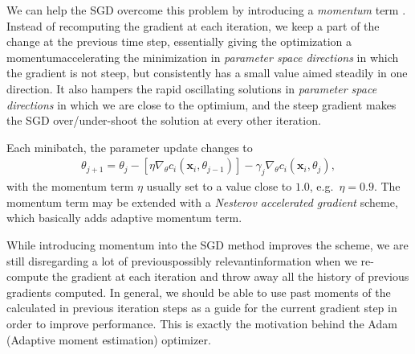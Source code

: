 \documentclass[a4paper, twocolumn]{article}
\begin{document}
We can help the SGD overcome this problem by introducing a \textit{momentum} term \autocite{qian1999monentum}. Instead of recomputing the gradient at each iteration, we keep a part of the change at the previous time step, essentially giving the optimization a momentum\textemdash accelerating the minimization in \textit{parameter space directions} in which the gradient is not steep, but consistently has a small value aimed steadily in one direction. It also hampers the rapid oscillating solutions in \textit{parameter space directions} in which we are close to the optimium, and the steep gradient makes the SGD over/under-shoot the solution at every other iteration. 

Each minibatch, the parameter update changes to
\begin{align}
\theta_{j+1} =\theta_j - \left[\eta \nabla_\theta c_i(\mathbf{x}_i,\theta_{j-1}) \right] - \gamma_j\nabla_\theta c_i(\mathbf{x}_i,\theta_j), \nonumber
\end{align}
with the momentum term $\eta$ usually set to a value close to $1.0$, e.g.\ $\eta=0.9$. The momentum term may be extended with a \textit{Nesterov accelerated gradient} scheme, which basically adds adaptive momentum term.

While introducing momentum into the SGD method improves the scheme, we are still disregarding a lot of previous\textemdash possibly relevant\textemdash information when we re-compute the gradient at each iteration and throw away all the history of previous gradients computed. In general, we should be able to use past moments of the calculated in previous iteration steps as a guide for the current gradient step in order to improve performance. This is exactly the motivation behind the Adam (Adaptive moment estimation) optimizer\autocite{kingma2014adam}.
\end{document}

